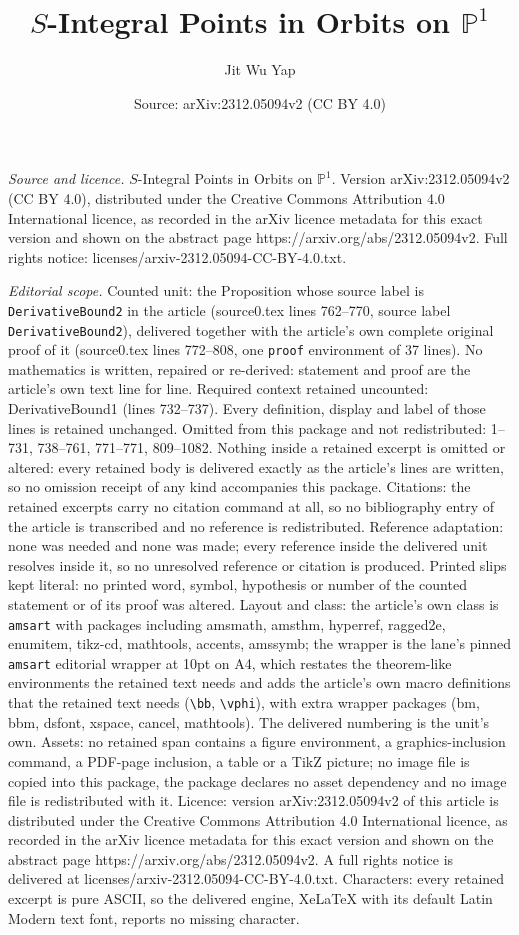 \documentclass[10pt,a4paper]{amsart}
\title[$S$-Integral Points in Orbits on $\mathbb{P}^1$]{$S$-Integral Points in Orbits on $\mathbb{P}^1$}
\author{Jit Wu Yap}
\date{Source: arXiv:2312.05094v2 (CC BY 4.0)}
\begin{document}
\maketitle

\noindent\emph{Source and licence.} $S$-Integral Points in Orbits on $\mathbb{P}^1$. Version arXiv:2312.05094v2 (CC BY 4.0), distributed under the Creative Commons Attribution 4.0 International licence, as recorded in the arXiv licence metadata for this exact version and shown on the abstract page https://arxiv.org/abs/2312.05094v2. Full rights notice: licenses/arxiv-2312.05094-CC-BY-4.0.txt.\par\smallskip

\noindent\textit{Editorial scope.} Counted unit: the Proposition whose source label is \texttt{DerivativeBound2} in the article (source0.tex lines 762--770, source label \texttt{DerivativeBound2}), delivered together with the article's own complete original proof of it (source0.tex lines 772--808, one \texttt{proof} environment of 37 lines). No mathematics is written, repaired or re-derived: statement and proof are the article's own text line for line. Required context retained uncounted: DerivativeBound1 (lines 732--737). Every definition, display and label of those lines is retained unchanged. Omitted from this package and not redistributed: 1--731, 738--761, 771--771, 809--1082. Nothing inside a retained excerpt is omitted or altered: every retained body is delivered exactly as the article's lines are written, so no omission receipt of any kind accompanies this package. Citations: the retained excerpts carry no citation command at all, so no bibliography entry of the article is transcribed and no reference is redistributed. Reference adaptation: none was needed and none was made; every reference inside the delivered unit resolves inside it, so no unresolved reference or citation is produced. Printed slips kept literal: no printed word, symbol, hypothesis or number of the counted statement or of its proof was altered. Layout and class: the article's own class is \texttt{amsart} with packages including amsmath, amsthm, hyperref, ragged2e, enumitem, tikz-cd, mathtools, accents, amssymb; the wrapper is the lane's pinned \texttt{amsart} editorial wrapper at 10pt on A4, which restates the theorem-like environments the retained text needs and adds the article's own macro definitions that the retained text needs (\texttt{\textbackslash bb}, \texttt{\textbackslash vphi}), with extra wrapper packages (bm, bbm, dsfont, xspace, cancel, mathtools). The delivered numbering is the unit's own. Assets: no retained span contains a figure environment, a graphics-inclusion command, a PDF-page inclusion, a table or a TikZ picture; no image file is copied into this package, the package declares no asset dependency and no image file is redistributed with it. Licence: version arXiv:2312.05094v2 of this article is distributed under the Creative Commons Attribution 4.0 International licence, as recorded in the arXiv licence metadata for this exact version and shown on the abstract page https://arxiv.org/abs/2312.05094v2. A full rights notice is delivered at licenses/arxiv-2312.05094-CC-BY-4.0.txt. Characters: every retained excerpt is pure ASCII, so the delivered engine, XeLaTeX with its default Latin Modern text font, reports no missing character.
\end{document}

